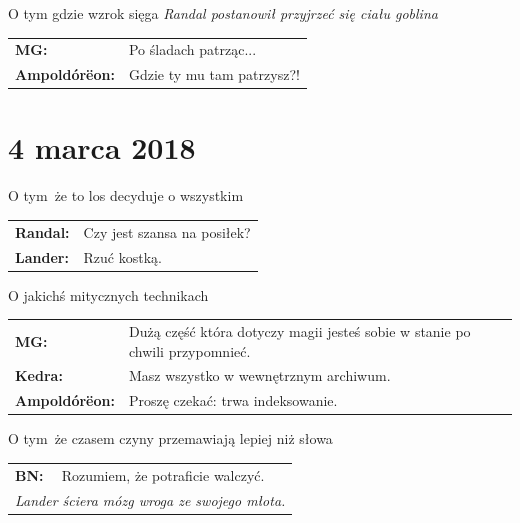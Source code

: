 \documentclass[10pt,twoside,twocolumn]{book}
\begin{document}
\begin{rpg-quotebox}{O tym gdzie wzrok sięga}
   \textit{Randal postanowił przyjrzeć się ciału goblina}\\

   \begin{tabularx}{\columnwidth}{lX}
      \textbf{MG:} &  Po śladach patrząc...\\
      \textbf{Ampoldórëon:} &  Gdzie ty mu tam patrzysz?!\\
   \end{tabularx}
\end{rpg-quotebox}

\section*{4 marca 2018}

\begin{rpg-quotebox}{O tym\, że to los decyduje o wszystkim}
   \begin{tabularx}{\columnwidth}{lX}
      \textbf{Randal:} & Czy jest szansa na posiłek?\\
      \textbf{Lander:} & Rzuć kostką.\\
   \end{tabularx}
\end{rpg-quotebox}

\begin{rpg-quotebox}{O jakichś mitycznych technikach}
   \begin{tabularx}{\columnwidth}{lX}
      \textbf{MG:} & Dużą część która dotyczy magii jesteś sobie w stanie po chwili przypomnieć.\\
      \textbf{Kedra:} & Masz wszystko w wewnętrznym archiwum.\\
      \textbf{Ampoldórëon:} & Proszę czekać: trwa indeksowanie.\\
   \end{tabularx}
\end{rpg-quotebox}

\begin{rpg-quotebox}{O tym\, że czasem czyny przemawiają lepiej niż słowa}
   \begin{tabularx}{\columnwidth}{lX}
      \textbf{BN:} &  Rozumiem, że potraficie walczyć.\\
      \multicolumn{2}{l}{\textit{Lander ściera mózg wroga ze swojego młota.}}\\
   \end{tabularx}
\end{rpg-quotebox}
\end{document}
